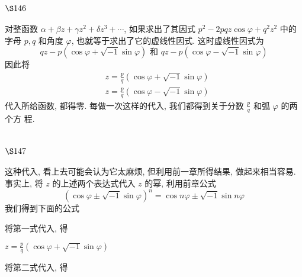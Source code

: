 \section{$\S 146$}

对整函数 $\alpha+\beta z+\gamma z^{2}+\delta z^{3}+\cdots$, 如果求出了其因式 $p^{2}-2 p q z \cos \varphi+q^{2} z^{2}$ 中的字母 $p, q$ 和角度 $\varphi$, 也就等于求出了它的虚线性因式. 这时虚线性因式为
\[
q z-p(\cos \varphi+\sqrt{-1} \sin \varphi) \text { 和 } q z-p(\cos \varphi-\sqrt{-1} \sin \varphi)
\]
因此将
\[
\begin{aligned}
& z=\frac{p}{q}(\cos \varphi+\sqrt{-1} \sin \varphi) \\
& z=\frac{p}{q}(\cos \varphi-\sqrt{-1} \sin \varphi)
\end{aligned}
\]
代入所给函数, 都得零. 每做一次这样的代入, 我们都得到关于分数 $\frac{p}{q}$ 和弧 $\varphi$ 的两个方 程.

\section{$\S 147$}

这种代入, 看上去可能会认为它太麻烦, 但利用前一章所得结果, 做起来相当容易. 事实上, 将 $z$ 的上述两个表达式代入 $z$ 的幂, 利用前章公式
\[
(\cos \varphi \pm \sqrt{-1} \sin \varphi)^{n}=\cos n \varphi \pm \sqrt{-1} \sin n \varphi
\]
我们得到下面的公式

将第一式代入, 得

$z=\frac{p}{q}(\cos \varphi+\sqrt{-1} \sin \varphi)$

将第二式代入, 得

